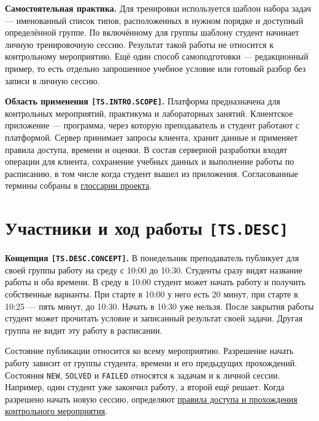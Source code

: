 \documentclass[12pt,a4paper]{article}
\begin{document}
\textbf{Самостоятельная практика.} Для тренировки используется шаблон набора задач --- именованный список типов, расположенных в нужном порядке и доступный определённой группе. По включённому для группы шаблону студент начинает личную тренировочную сессию. Результат такой работы не относится к контрольному мероприятию. Ещё один способ самоподготовки --- редакционный пример, то есть отдельно запрошенное учебное условие или готовый разбор без записи в личную сессию.

\hypertarget{ts-intro-scope}{} \textbf{Область применения \texttt{[TS.\allowbreak{}INTRO.\allowbreak{}SCOPE]}.} Платформа предназначена для контрольных мероприятий, практикума и лабораторных занятий. Клиентское приложение --- программа, через которую преподаватель и студент работают с платформой. Сервер принимает запросы клиента, хранит данные и применяет правила доступа, времени и оценки. В состав серверной разработки входят операции для клиента, сохранение учебных данных и выполнение работы по расписанию, в том числе когда студент вышел из приложения. Согласованные термины собраны в {\href{../notes/methodology/Глоссарий.pdf\#глоссарий}{глоссарии проекта}}.

\section{\texorpdfstring{Участники и ход работы \texttt{{[}TS.DESC{]}}}{Участники и ход работы {[}TS.DESC{]}}}\label{2-ux443ux447ux430ux441ux442ux43dux438ux43aux438-ux438-ux445ux43eux434-ux440ux430ux431ux43eux442ux44b-tsdesc}

\hypertarget{2-участники-и-ход-работы-tsdesc}{}

\hypertarget{ts-desc}{}

\hypertarget{ts-desc-concept}{} \textbf{Концепция \texttt{[TS.\allowbreak{}DESC.\allowbreak{}CONCEPT]}.} В понедельник преподаватель публикует для своей группы работу на среду с 10:00 до 10:30. Студенты сразу видят название работы и оба времени. В среду в 10:00 студент может начать работу и получить собственные варианты. При старте в 10:00 у него есть 20 минут, при старте в 10:25 --- пять минут, до 10:30. Начать в 10:30 уже нельзя. После закрытия работы студент может прочитать условие и записанный результат своей задачи. Другая группа не видит эту работу в расписании.

Состояние публикации относится ко всему мероприятию. Разрешение начать работу зависит от группы студента, времени и его предыдущих прохождений. Состояния \texttt{NEW}, \texttt{SOLVED} и \texttt{FAILED} относятся к задачам и к личной сессии. Например, один студент уже закончил работу, а второй ещё решает. Когда разрешено начать новую сессию, определяют {\hyperlink{правила-доступа-и-прохождения-контрольного-мероприятия}{правила доступа и прохождения контрольного мероприятия}}.
\end{document}
